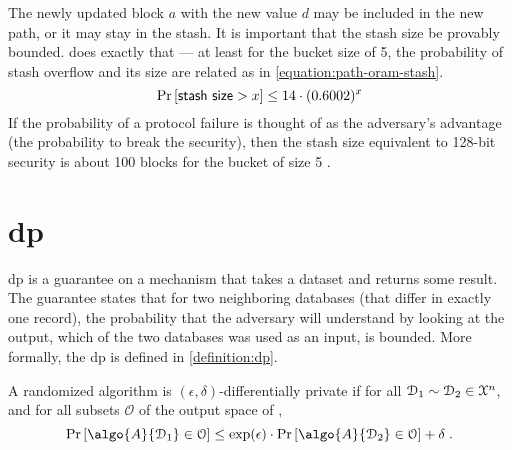 			The newly updated block $a$ with the new value $d$ may be included in the new path, or it may stay in the stash.
			It is important that the stash size be provably bounded.
			\cite[Theorem 1]{path-oram} does exactly that --- at least for the bucket size of 5, the probability of stash overflow and its size are related as in \cref{equation:path-oram-stash}.
			\begin{equation}\label{equation:path-oram-stash}
				\probability{ \mathsf{stash\ size} > x } \leq 14 \cdot (0.6002) ^ x
			\end{equation}
			If the probability of a protocol failure is thought of as the adversary's advantage (the probability to break the security), then the stash size equivalent to 128-bit security is about 100 blocks for the bucket of size 5 \cite[Figure 5]{path-oram}.

	\section{\texorpdfstring{\acrlong{dp}}{Differential Privacy}}

		\acrfull{dp} is a guarantee on a mechanism that takes a dataset and returns some result.
		The guarantee states that for two neighboring databases (that differ in exactly one record), the probability that the adversary will understand by looking at the output, which of the two databases was used as an input, is bounded.
		More formally, the \acrlong{dp} is defined in \cref{definition:dp}.

		\begin{definition}\label{definition:dp}
			A randomized algorithm  is $(\epsilon, \delta)$-differentially private if for all $\mathcal{D}_1 \sim \mathcal{D}_2 \in \mathcal{X}^{n}$, and for all subsets $\mathcal{O}$ of the output space of ,
			\[
				\probability{ \algo{A}{ \database_1 } \in \mathcal{O} } \leq \exp(\epsilon) \cdot \probability{ \algo{A}{ \database_2 } \in \mathcal{O} } + \delta \; .
			\]
		\end{definition}

